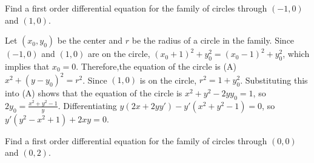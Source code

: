 \documentclass{ximera}
\begin{document}
\begin{problem}\label{exer:4.5.12}
Find a
first order differential equation for the family of circles through $(-1,0)$ and $(1,0)$.

\begin{solution}
Let $(x_0,y_0)$ be the center
and $r$ be the radius of a circle in the family. Since $(-1,0)$ and
$(1,0)$ are on the circle, $(x_0+1)^2+y_0^2=(x_0-1)^2+y_0^2$, which
implies that $x_0=0$. Therefore,the equation of the circle is (A)
$x^2+(y-y_0)^2=r^2$. Since $(1,0)$ is on the circle, $r^2=1+y_0^2$.
Substituting this into (A) shows that the equation of the circle is
$x^2+y^2-2yy_0=1$, so $2y_0=\frac{x^2+y^2-1}{y}$. Differentiating
$y(2x+2yy')-y'(x^2+y^2-1)=0$, so $y'(y^2-x^2+1)+2xy=0$.
\end{solution}
\end{problem}

\begin{problem}\label{exer:4.5.13}
Find a
first order differential equation for the family of circles through $(0,0)$ and $(0,2)$.
\end{problem}
\end{document}

